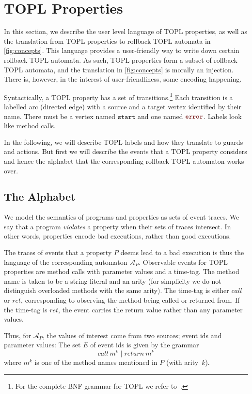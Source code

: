 \documentclass[9pt, preprint]{sigplanconf} %
\newcommand{\A}{\ensuremath{\mathcal{A}}}
\newcommand{\error}{\ensuremath{\textcolor{darkred}{\mathtt{error}}}\xspace}
\newcommand{\start}{\ensuremath{\mathtt{start}}\xspace}
\theoremstyle{definition}
\theoremstyle{remark}
\begin{document}
\section{TOPL Properties}\label{sec:topl} %

In this section, we describe the user level language of TOPL
properties, as well as the translation from TOPL properties to
rollback TOPL automata in \autoref{fig:concepts}.
%
This language provides a user-friendly way to write down certain
rollback TOPL automata.
As such, TOPL properties form a subset of rollback TOPL
automata, and the translation in \autoref{fig:concepts} is morally an
injection. There is, however, in the interest of user-friendliness,
some encoding happening.

Syntactically, a TOPL property has a set of transitions.\footnote{For
  the complete BNF grammar for TOPL we refer to~\cite{our-fool2011}.}
Each transition is a labelled arc (directed edge) with a source and a
target vertex identified by their name.
There must be a vertex named \start and one named \error.
Labels look like method calls.

In the following, we will describe TOPL labels and how they translate to guards
and actions. But first we will describe the events that a TOPL
property considers and hence the alphabet that the corresponding
rollback TOPL automaton works over.

\subsection{The Alphabet}

We model the semantics of programs and properties as sets of event
traces. We say that a program \emph{violates} a property when their sets of traces intersect.
In other words, properties encode bad executions, rather than good executions.

The traces of events that a property $P$ deems lead to a bad execution is thus the language
of the corresponding automaton $\A_P$. Observable events for TOPL properties are method calls
with parameter values and a time-tag. The method name is taken to be a
string literal and an arity (for simplicity we do not distinguish
overloaded methods with the same arity). The time-tag is either $call$ or $ret$,
corresponding to observing the method being called or returned
from. If the time-tag is $ret$, the event carries the return value
rather than any parameter values.

Thus, for $\A_P$, the values of interest come from two
sources; event ids and parameter values: The set $E$ of event ids is given by
the grammar
\[
call\ m^k \mid return\ m^k
\]
where $m^k$ is one of the method names mentioned in $P$ (with arity~$k$).
\end{document}
